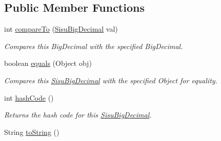 \subsection*{Public Member Functions}
\begin{DoxyCompactItemize}
\item 
int \hyperlink{classcom_1_1aarrelaakso_1_1drawl_1_1_sisu_big_decimal_a450f5da2c47612d8af98e59958ebccc6}{compare\+To} (\hyperlink{classcom_1_1aarrelaakso_1_1drawl_1_1_sisu_big_decimal}{Sisu\+Big\+Decimal} val)
\begin{DoxyCompactList}\small\item\em Compares this Big\+Decimal with the specified Big\+Decimal. \end{DoxyCompactList}\item 
boolean \hyperlink{classcom_1_1aarrelaakso_1_1drawl_1_1_sisu_big_decimal_ade8b690f00af26d67a84b812ad694f20}{equals} (Object obj)
\begin{DoxyCompactList}\small\item\em Compares this \hyperlink{classcom_1_1aarrelaakso_1_1drawl_1_1_sisu_big_decimal}{Sisu\+Big\+Decimal} with the specified Object for equality. \end{DoxyCompactList}\item 
int \hyperlink{classcom_1_1aarrelaakso_1_1drawl_1_1_sisu_big_decimal_a34555e12897a07cb48ac84a5b95f320a}{hash\+Code} ()
\begin{DoxyCompactList}\small\item\em Returns the hash code for this \hyperlink{classcom_1_1aarrelaakso_1_1drawl_1_1_sisu_big_decimal}{Sisu\+Big\+Decimal}. \end{DoxyCompactList}\item 
String \hyperlink{classcom_1_1aarrelaakso_1_1drawl_1_1_sisu_big_decimal_ac05b8909bde406486e3fb45e154c5ff4}{to\+String} ()
\end{DoxyCompactItemize}
